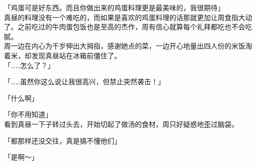 「鸡蛋可是好东西。而且你做出来的鸡蛋料理更是最美味的，我很期待」\\

真昼的料理没有一个难吃的，而如果是喜欢的鸡蛋料理的话那就更加让周食指大动了。之前吃过的牛肉蛋包饭也是至高的杰作，周有信心就算每个礼拜都吃也不会吃腻。\\

周一边在内心为千岁伸出大拇指，感谢她点的菜，一边开心地量出四人份的米饭淘着米，却发现真昼站在冰箱前僵住了。\\

「……怎么了？」

「……虽然你这么说让我很高兴，但禁止突然袭击！」

「什么啊」

「你不用知道」\\

看到真昼一下子转过头去，开始切起了做汤的食材，周只好疑惑地歪过脑袋。\\

\vspace{2\baselineskip}

「都那样还没交往，真是搞不懂他们」

「是啊～」
